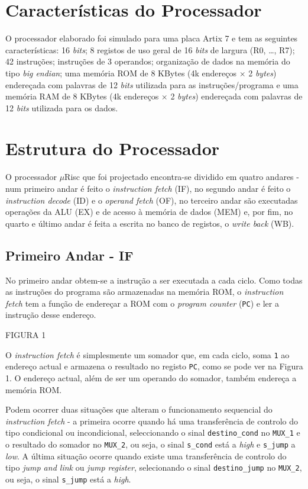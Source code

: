 \documentclass[11pt]{article}
\numberwithin{equation}{section}
\begin{document}
\section{Características do Processador}

O processador elaborado foi simulado para uma placa Artix 7 e tem as seguintes características: 16 \textit{bits}; 8 registos de uso geral de 16 \textit{bits} de largura (R0, \ldots, R7); 42 instruções; instruções de 3 operandos; organização de dados na memória do tipo \textit{big endian}; uma memória ROM de 8 KBytes (4k endereços $\times$ 2 \textit{bytes}) endereçada com palavras de 12 \textit{bits} utilizada para as instruções/programa e uma memória RAM de 8 KBytes (4k endereços $\times$ 2 \textit{bytes}) endereçada com palavras de 12 \textit{bits} utilizada para os dados.

\section{Estrutura do Processador}

O processador $\mu$Risc que foi projectado encontra-se dividido em quatro andares - num primeiro andar é feito o \textit{instruction fetch} (IF), no segundo andar é feito o \textit{instruction decode} (ID) e o \textit{operand fetch} (OF), no terceiro andar são executadas operações da ALU (EX) e de acesso à memória de dados (MEM) e, por fim, no quarto e último andar é feita a escrita no banco de registos, o \textit{write back} (WB).

\subsection{Primeiro Andar - IF}

No primeiro andar obtem-se a instrução a ser executada a cada ciclo. Como todas as instruções do programa são armazenadas na memória ROM, o \textit{instruction fetch} tem a função de endereçar a ROM com o \textit{program counter} (\texttt{PC}) e ler a instrução desse endereço.

FIGURA 1

O \textit{instruction fetch} é simplesmente um somador que, em cada ciclo, soma \texttt{1} ao endereço actual e armazena o resultado no registo \texttt{PC}, como se pode ver na Figura 1. O endereço actual, além de ser um operando do somador, também endereça a memória ROM.

Podem ocorrer duas situações que alteram o funcionamento sequencial do \textit{instruction fetch} - a primeira ocorre quando há uma transferência de controlo do tipo condicional ou incondicional, seleccionando o sinal \texttt{destino\_cond} no \texttt{MUX\_1} e o resultado do somador no \texttt{MUX\_2}, ou seja, o sinal \texttt{s\_cond} está a \textit{high} e \texttt{s\_jump} a \textit{low}. A última situação ocorre quando existe uma transferência de controlo do tipo \textit{jump and link} ou \textit{jump register}, selecionando o sinal \texttt{destino\_jump} no \texttt{MUX\_2}, ou seja, o sinal \texttt{s\_jump} está a \textit{high}.
\end{document}
